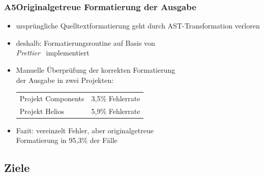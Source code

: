       \begin{frame}
        \frametitle{A5\hspace{0.75em}Originalgetreue Formatierung der Ausgabe}
        \begin{itemize}
          \item ursprüngliche Quelltextformatierung geht durch AST-Transformation verloren
          \item deshalb: Formatierungsroutine auf Basis von\\\textit{Prettier}~\autocite{SOFTWARE:PRETTIER} implementiert
          \item Manuelle Überprüfung der korrekten Formatierung\\der Ausgabe in zwei Projekten:\\
            \medskip
            {
              \footnotesize
              \begin{tabu} to 
                Projekt Components & 3,5\% Fehlerrate \\
                Projekt Helios     & 5,9\% Fehlerrate \\
              \end{tabu}
            }
          \item Fazit: vereinzelt Fehler, aber originalgetreue\\Formatierung in 95,3\% der Fälle
        \end{itemize}
      \end{frame}

    \subsection{Ziele}

